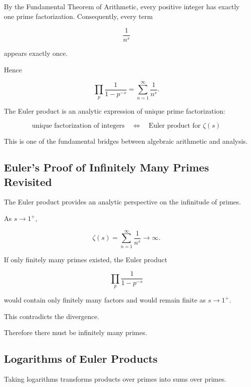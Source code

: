 By the Fundamental Theorem of Arithmetic, every positive integer has exactly
one prime factorization. Consequently, every term

\[ \frac1{n^s} \]

appears exactly once.

Hence

\[ \prod_p\frac{1}{1-p^{-s}}=\sum_{n=1}^{\infty}\frac1{n^s}. \]

\begin{conceptbox}
The Euler product is an analytic expression of unique prime factorization:

\[
\boxed{
\text{unique factorization of integers}
\quad\Longleftrightarrow\quad
\text{Euler product for }\zeta(s)
}
\]

This is one of the fundamental bridges between algebraic arithmetic and
analysis.
\end{conceptbox}

\subsection{Euler's Proof of Infinitely Many Primes Revisited}
\label{subsec:euler-infinite-primes-analytic}

The Euler product provides an analytic perspective on the infinitude of
primes.

As \(s\to1^+\),

\[ \zeta(s)=\sum_{n=1}^{\infty}\frac1{n^s}\to\infty. \]

If only finitely many primes existed, the Euler product

\[ \prod_p\frac1{1-p^{-s}} \]

would contain only finitely many factors and would remain finite as
\(s\to1^+\).

This contradicts the divergence.

Therefore there must be infinitely many primes.

\subsection{Logarithms of Euler Products}
\label{subsec:logarithms-euler-products}

Taking logarithms transforms products over primes into sums over primes.

